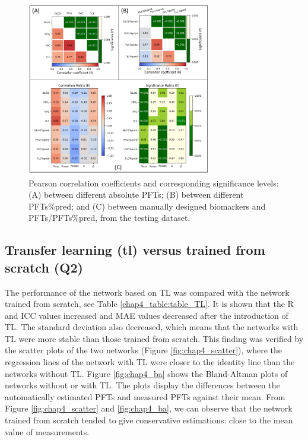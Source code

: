\begin{figure}[tb]
    \centering
    \includegraphics[width=8cm]{manual_biomarkers.png}
    \caption{Pearson correlation coefficients and corresponding significance levels: (A) between different absolute PFTs; (B) between different PFTs\%pred; and (C) between manually designed biomarkers and PFTs/PFTs\%pred, from the testing dataset.}
    \label{fig:chap4_manual}
\end{figure}



\subsection{Transfer learning (tl) versus trained from scratch (Q2)}
 
The performance of the network based on TL was compared with the network trained from scratch, see Table \ref{chap4_table:table_TL}. It is shown that the R and ICC values increased and MAE values decreased after the introduction of TL. The standard deviation also decreased, which means that the networks with TL were more stable than those trained from scratch. This finding was verified by the scatter plots of the two networks (Figure \ref{fig:chap4_scatter}), where the regression lines of the network with TL were closer to the identity line than the networks without TL. Figure \ref{fig:chap4_ba} shows the Bland-Altman plots of networks without or with TL. The plots display the differences between the automatically estimated PFTs and measured PFTs against their mean. From Figure \ref{fig:chap4_scatter} and \ref{fig:chap4_ba}, we can observe that the network trained from scratch tended to give conservative estimations: close to the mean value of measurements.


